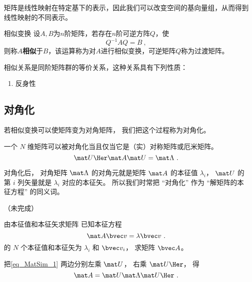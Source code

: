 
\begin{issues}
\issueDraft
\end{issues}


矩阵是线性映射在特定基下的表示，因此我们可以改变空间的基向量组，从而得到线性映射的不同表示。
\begin{definition}{相似变换}\label{def_MatSim_1}
设$A,B$为$n$阶矩阵，若存在$n$阶可逆方阵$Q$，使
\begin{equation}
Q^{-1}AQ=B~,
\end{equation}
则称$A$\textbf{相似}于$B$，该运算称为对$A$进行相似变换，可逆矩阵$Q$称为过渡矩阵。
\end{definition}
相似关系是同阶矩阵群的等价关系，这种关系具有下列性质：

\begin{enumerate}
\item 反身性
\end{enumerate}

\subsection{对角化}
若相似变换可以使矩阵变为对角矩阵， 我们把这个过程称为对角化。

一个 $N$ 维矩阵可以被对角化当且仅当它是（实）对称矩阵或厄米矩阵。
\begin{equation}\label{eq_MatSim_1}
\mat U\Her \mat A \mat U = \mat \Lambda~.
\end{equation}

对角化后， 对角矩阵 $\mat \Lambda$ 的对角元就是矩阵 $\mat A$ 的本征值 $\lambda_i$， $\mat U$ 的第 $i$ 列矢量就是 $\lambda_i$ 对应的本征矢。 所以我们时常把 “对角化” 作为 “解矩阵的本征方程” 的同义词。

（未完成）

\begin{example}{由本征值和本征矢求矩阵}
已知本征方程
\begin{equation}
\mat A \bvec v = \lambda \bvec v~.
\end{equation}
的 $N$ 个本征值和本征矢为 $\lambda_i$ 和 $\bvec v_i$， 求矩阵 $\bvec A$。

把\autoref{eq_MatSim_1} 两边分别左乘 $\mat U$， 右乘 $\mat U\Her$， 得
\begin{equation}
\mat A = \mat U \mat \Lambda \mat U\Her~.
\end{equation}
\end{example}
